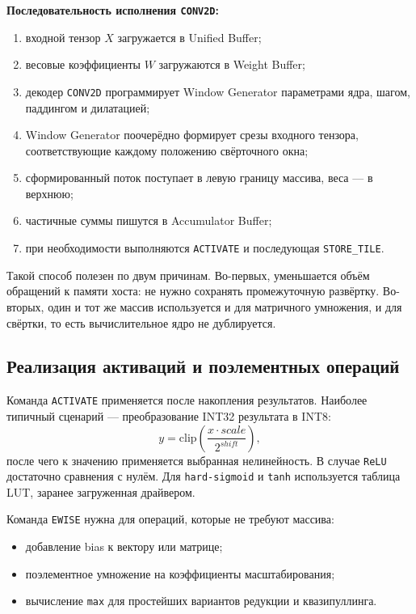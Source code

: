 \documentclass[12pt,a4paper]{article}
\begin{document}
\textbf{Последовательность исполнения \texttt{CONV2D}:}
\begin{enumerate}
    \item входной тензор \(X\) загружается в Unified Buffer;
    \item весовые коэффициенты \(W\) загружаются в Weight Buffer;
    \item декодер \texttt{CONV2D} программирует Window Generator параметрами ядра, шагом, паддингом и дилатацией;
    \item Window Generator поочерёдно формирует срезы входного тензора, соответствующие каждому положению свёрточного окна;
    \item сформированный поток поступает в левую границу массива, веса --- в верхнюю;
    \item частичные суммы пишутся в Accumulator Buffer;
    \item при необходимости выполняются \texttt{ACTIVATE} и последующая \texttt{STORE\_TILE}.
\end{enumerate}

Такой способ полезен по двум причинам. Во-первых, уменьшается объём обращений к памяти хоста: не нужно сохранять промежуточную развёртку. Во-вторых, один и тот же массив используется и для матричного умножения, и для свёртки, то есть вычислительное ядро не дублируется.

\subsection{Реализация активаций и поэлементных операций}

Команда \texttt{ACTIVATE} применяется после накопления результатов. Наиболее типичный сценарий --- преобразование INT32 результата в INT8:
\[
y = \text{clip}\left(\frac{x \cdot scale}{2^{shift}}\right),
\]
после чего к значению применяется выбранная нелинейность. В случае \texttt{ReLU} достаточно сравнения с нулём. Для \texttt{hard-sigmoid} и \texttt{tanh} используется таблица LUT, заранее загруженная драйвером.

Команда \texttt{EWISE} нужна для операций, которые не требуют массива:
\begin{itemize}
    \item добавление bias к вектору или матрице;
    \item поэлементное умножение на коэффициенты масштабирования;
    \item вычисление \texttt{max} для простейших вариантов редукции и квазипуллинга.
\end{itemize}
\end{document}
